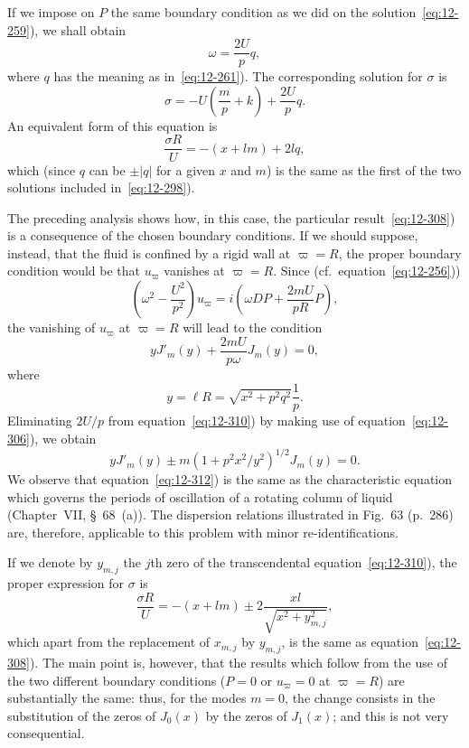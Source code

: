 If we impose on $P$ the same boundary condition as we did on the solution~\eqref{eq:12-259}), we shall obtain
\begin{equation}
\label{eq:12-306}
\omega = \frac{2U}{p}q,
\end{equation}
where $q$ has the meaning as in~\eqref{eq:12-261}). The corresponding solution for $\sigma$ is
\begin{equation}
\label{eq:12-307}
\sigma = -U\left(\frac{m}{p}+k\right) + \frac{2U}{p}q.
\end{equation}
An equivalent form of this equation is
\begin{equation}
\label{eq:12-308}
\frac{\sigma R}{U} = -(x+lm) + 2lq,
\end{equation}
which (since $q$ can be $\pm |q|$ for a given $x$ and $m$) is the same as the first of the two solutions included in~\eqref{eq:12-298}).

The preceding analysis shows how, in this case, the particular result~\eqref{eq:12-308}) is a consequence of the chosen boundary conditions. If we should suppose, instead, that the fluid is confined by a rigid wall at $\varpi = R$, the proper boundary condition would be that $u_\varpi$ vanishes at $\varpi = R$. Since (cf.\ equation~\eqref{eq:12-256}))
\begin{equation}
\label{eq:12-309}
\left(\omega^2 - \frac{U^2}{p^2}\right)u_\varpi = i\left(\omega DP + \frac{2mU}{pR}P\right),
\end{equation}
the vanishing of $u_\varpi$ at $\varpi = R$ will lead to the condition
\begin{equation}
\label{eq:12-310}
yJ'_m(y) + \frac{2mU}{p\omega}J_m(y) = 0,
\end{equation}
where
\begin{equation}
\label{eq:12-311}
y = \ell R = \sqrt{x^2+p^2q^2}\frac{1}{p}.
\end{equation}
Eliminating $2U/p$ from equation~\eqref{eq:12-310}) by making use of equation~\eqref{eq:12-306}), we obtain
\begin{equation}
\label{eq:12-312}
yJ'_m(y) \pm m(1+p^2x^2/y^2)^{1/2}J_m(y) = 0.
\end{equation}
We observe that equation~\eqref{eq:12-312}) is the same as the characteristic equation which governs the periods of oscillation of a rotating column of liquid (Chapter~VII, \S~68~(a)). The dispersion relations illustrated in Fig.~63 (p.~286) are, therefore, applicable to this problem with minor re-identifications.

If we denote by $y_{m,j}$ the $j$th zero of the transcendental equation~\eqref{eq:12-310}), the proper expression for $\sigma$ is
\begin{equation}
\label{eq:12-313}
\frac{\sigma R}{U} = -(x+lm) \pm 2\frac{xl}{\sqrt{x^2+y^2_{m,j}}},
\end{equation}
which apart from the replacement of $x_{m,j}$ by $y_{m,j}$, is the same as equation~\eqref{eq:12-308}). The main point is, however, that the results which follow from the use of the two different boundary conditions ($P = 0$ or $u_\varpi = 0$ at $\varpi = R$) are substantially the same: thus, for the modes $m = 0$, the change consists in the substitution of the zeros of $J_0(x)$ by the zeros of $J_1(x)$; and this is not very consequential.

